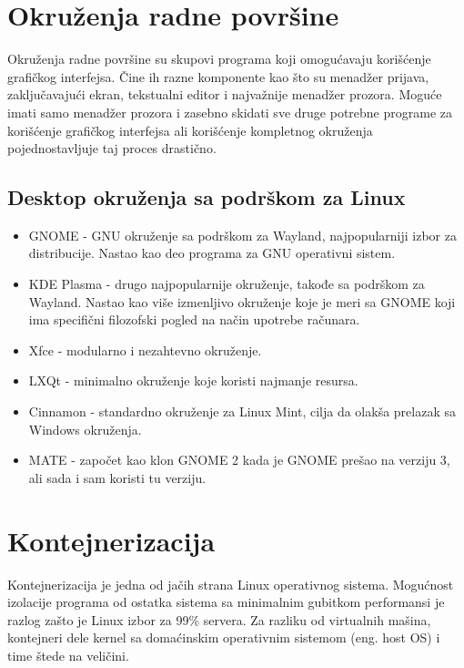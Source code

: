 \documentclass[a4paper,14pt]{article}
\begin{document}
\section{Okruženja radne površine}
Okruženja radne površine su skupovi programa koji omogućavaju korišćenje grafičkog interfejsa. Čine ih razne komponente kao što su menadžer prijava, zaključavajući ekran, tekstualni editor i najvažnije menadžer prozora. Moguće imati samo menadžer prozora i zasebno skidati sve druge potrebne programe za korišćenje grafičkog interfejsa ali korišćenje kompletnog okruženja pojednostavljuje taj proces drastično.
\subsection{Desktop okruženja sa podrškom za Linux}
\begin{itemize}
\item GNOME - GNU okruženje sa podrškom za Wayland, najpopularniji izbor za distribucije. Nastao kao deo programa za GNU operativni sistem.
\item KDE Plasma - drugo najpopularnije okruženje, takođe sa podrškom za Wayland. Nastao kao više izmenljivo okruženje koje je meri sa GNOME koji ima specifični filozofski pogled na način upotrebe računara.
\item Xfce - modularno i nezahtevno okruženje.
\item LXQt - minimalno okruženje koje koristi najmanje resursa.
\item Cinnamon - standardno okruženje za Linux Mint, cilja da olakša prelazak sa Windows okruženja.
\item MATE - započet kao klon GNOME 2 kada je GNOME prešao na verziju 3, ali sada i sam koristi tu verziju.
\end{itemize}
\newpage

\section{Kontejnerizacija}
Kontejnerizacija je jedna od jačih strana Linux operativnog sistema. Mogućnost izolacije programa od ostatka sistema sa minimalnim gubitkom performansi je razlog zašto je Linux izbor za 99\% servera. Za razliku od virtualnih mašina, kontejneri dele kernel sa domaćinskim operativnim sistemom (eng. host OS) i time štede na veličini.
\end{document}
